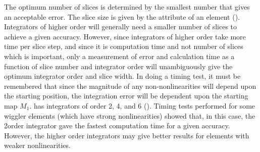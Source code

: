 The optimum number of slices is determined by the smallest number that gives an acceptable
error. The slice size is given by the  attribute of an element ().
Integrators of higher order will generally need a smaller number of slices to achieve a given
accuracy. However, since integrators of higher order take more time per slice step, and since it is
computation time and not number of slices which is important, only a measurement of error and
calculation time as a function of slice number and integrator order will unambiguously give the
optimum integrator order and slice width.  In doing a timing test, it must be remembered that since
the magnitude of any non-nonlinearities will depend upon the starting position, the integration
error will be dependent upon the starting map $M_1$. \bmad has integrators of order 2, 4, and 6
(). Timing tests performed for some wiggler elements (which have strong
nonlinearities) showed that, in this case, the 2\Nd order integrator gave the fastest computation
time for a given accuracy. However, the higher order integrators may give better results for
elements with weaker nonlinearities.
